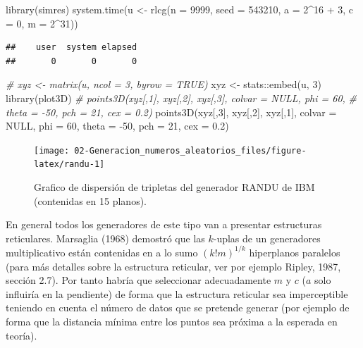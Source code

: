 \documentclass[
]{book}
\newenvironment{Shaded}{\begin{snugshade}}{\end{snugshade}}
\newcommand{\AttributeTok}[1]{\textcolor[rgb]{0.77,0.63,0.00}{#1}}
\newcommand{\CommentTok}[1]{\textcolor[rgb]{0.56,0.35,0.01}{\textit{#1}}}
\newcommand{\ConstantTok}[1]{\textcolor[rgb]{0.00,0.00,0.00}{#1}}
\newcommand{\DecValTok}[1]{\textcolor[rgb]{0.00,0.00,0.81}{#1}}
\newcommand{\FloatTok}[1]{\textcolor[rgb]{0.00,0.00,0.81}{#1}}
\newcommand{\FunctionTok}[1]{\textcolor[rgb]{0.00,0.00,0.00}{#1}}
\newcommand{\NormalTok}[1]{#1}
\newcommand{\OtherTok}[1]{\textcolor[rgb]{0.56,0.35,0.01}{#1}}
\newcommand{\SpecialCharTok}[1]{\textcolor[rgb]{0.00,0.00,0.00}{#1}}
\theoremstyle{break}
\theoremstyle{nonumberplain}
\begin{document}
\begin{Shaded}
\begin{Highlighting}[]
\FunctionTok{library}\NormalTok{(simres)}
\FunctionTok{system.time}\NormalTok{(u }\OtherTok{\textless{}{-}} \FunctionTok{rlcg}\NormalTok{(}\AttributeTok{n =} \DecValTok{9999}\NormalTok{, }
          \AttributeTok{seed =} \DecValTok{543210}\NormalTok{, }\AttributeTok{a =} \DecValTok{2}\SpecialCharTok{\^{}}\DecValTok{16} \SpecialCharTok{+} \DecValTok{3}\NormalTok{, }\AttributeTok{c =} \DecValTok{0}\NormalTok{, }\AttributeTok{m =} \DecValTok{2}\SpecialCharTok{\^{}}\DecValTok{31}\NormalTok{))}
\end{Highlighting}
\end{Shaded}

\begin{verbatim}
##    user  system elapsed 
##       0       0       0
\end{verbatim}

\begin{Shaded}
\begin{Highlighting}[]
\CommentTok{\# xyz \textless{}{-} matrix(u, ncol = 3, byrow = TRUE)}
\NormalTok{xyz }\OtherTok{\textless{}{-}}\NormalTok{ stats}\SpecialCharTok{::}\FunctionTok{embed}\NormalTok{(u, }\DecValTok{3}\NormalTok{)}
\FunctionTok{library}\NormalTok{(plot3D)}
\CommentTok{\# points3D(xyz[,1], xyz[,2], xyz[,3], colvar = NULL, phi = 60, }
\CommentTok{\#          theta = {-}50, pch = 21, cex = 0.2)}
\FunctionTok{points3D}\NormalTok{(xyz[,}\DecValTok{3}\NormalTok{], xyz[,}\DecValTok{2}\NormalTok{], xyz[,}\DecValTok{1}\NormalTok{], }\AttributeTok{colvar =} \ConstantTok{NULL}\NormalTok{, }\AttributeTok{phi =} \DecValTok{60}\NormalTok{, }
         \AttributeTok{theta =} \SpecialCharTok{{-}}\DecValTok{50}\NormalTok{, }\AttributeTok{pch =} \DecValTok{21}\NormalTok{, }\AttributeTok{cex =} \FloatTok{0.2}\NormalTok{)}
\end{Highlighting}
\end{Shaded}

\begin{figure}[!htb]

{\centering \texttt{[image: 02-Generacion\_numeros\_aleatorios\_files/figure-latex/randu-1]} 

}

\caption{Grafico de dispersión de tripletas del generador RANDU de IBM (contenidas en 15 planos).}\label{fig:randu}
\end{figure}

En general todos los generadores de este tipo van a presentar estructuras reticulares.
Marsaglia (1968) demostró que las \(k\)-uplas de un generadores multiplicativo están contenidas en a lo sumo \(\left(k!m\right)^{1/k}\) hiperplanos paralelos (para más detalles sobre la estructura reticular, ver por ejemplo Ripley, 1987, sección 2.7).
Por tanto habría que seleccionar adecuadamente \(m\) y \(c\) (\(a\) solo influiría en la pendiente) de forma que la estructura reticular sea imperceptible teniendo en cuenta el número de datos que se pretende generar (por ejemplo de forma que la distancia mínima entre los puntos sea próxima a la esperada en teoría).
\end{document}
